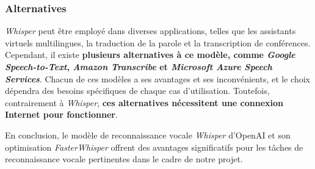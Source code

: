 \subsubsection*{Alternatives}
\textit{Whisper} peut être employé dans diverses applications, telles que les assistants virtuels multilingues, la traduction de la parole et la transcription de conférences.
Cependant, il existe \textbf{plusieurs alternatives à ce modèle, comme \textit{Google Speech-to-Text}, \textit{Amazon Transcribe} et \textit{Microsoft Azure Speech Services}}.
Chacun de ces modèles a ses avantages et ses inconvénients, et le choix dépendra des besoins spécifiques de chaque cas d'utilisation. Toutefois, contrairement à \textit{Whisper}, \textbf{ces alternatives nécessitent une connexion Internet pour fonctionner}.

En conclusion, le modèle de reconnaissance vocale \textit{Whisper} d'OpenAI et
son optimisation \textit{FasterWhisper} offrent des avantages significatifs
pour les tâches de reconnaissance vocale pertinentes dans le cadre de notre
projet.